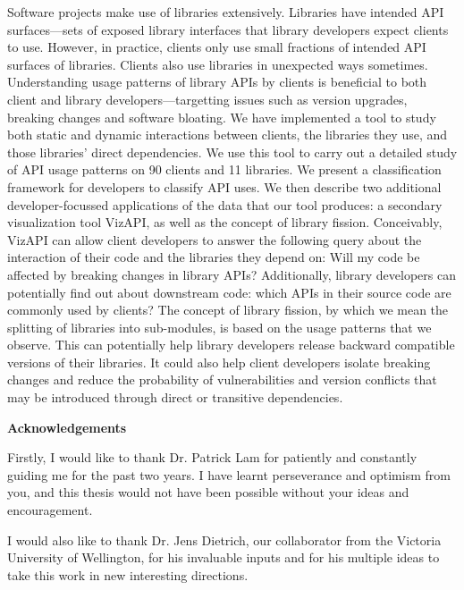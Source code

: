 Software projects make use of libraries extensively. Libraries have intended API surfaces—sets of exposed library interfaces that library developers expect clients to use. However, in practice, clients only use small fractions of intended API surfaces of libraries. Clients also use libraries in unexpected ways sometimes. Understanding usage patterns of library APIs by clients is beneficial to both client and library developers—targetting issues such as version upgrades, breaking changes and software bloating. We have implemented a tool to study both static and dynamic interactions between clients, the libraries they use, and those libraries’ direct dependencies. We use this tool to carry out a detailed study of API usage patterns on 90 clients and 11 libraries. We present a classification framework for developers to classify API uses. We then describe two additional developer-focussed applications of the data that our tool produces: a secondary visualization tool VizAPI, as well as the concept of library fission. Conceivably, VizAPI can allow client developers to answer the following query about the interaction of their code and the libraries they depend on: Will my code be affected by breaking changes in library APIs? Additionally, library developers can potentially find out about downstream code: which APIs in their source code are commonly used by clients? The concept of library fission, by which we mean the splitting of libraries into sub-modules, is based on the usage patterns that we observe. This can potentially help library developers release backward compatible versions of their libraries. It could also help client developers isolate breaking changes and reduce the probability of vulnerabilities and version conflicts that may be introduced through direct or transitive dependencies. 

\cleardoublepage


\begin{center}\textbf{Acknowledgements}\end{center}
Firstly, I would like to thank Dr. Patrick Lam for patiently and constantly guiding me for the past two years. I have learnt perseverance and optimism from you, and this thesis would not have been possible without your ideas and encouragement.

I would also like to thank Dr. Jens Dietrich, our collaborator from the Victoria University of Wellington, for his invaluable inputs and for his multiple ideas to take this work in new interesting directions.

